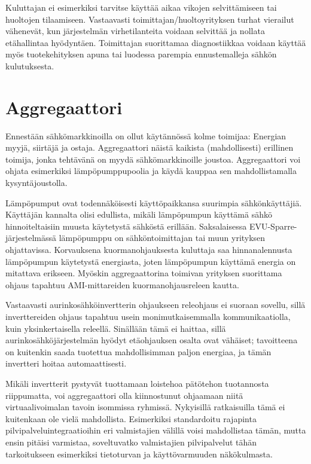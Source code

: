   Kuluttajan ei esimerkiksi tarvitse käyttää aikaa vikojen selvittämiseen tai huoltojen tilaamiseen. Vastaavasti toimittajan/huoltoyrityksen turhat vierailut vähenevät, kun järjestelmän virhetilanteita voidaan selvittää ja nollata etähallintaa hyödyntäen. Toimittajan suorittamaa diagnostiikkaa voidaan käyttää myös tuotekehityksen apuna tai luodessa parempia ennustemalleja sähkön kulutuksesta.

\section{Aggregaattori}

  Ennestään sähkömarkkinoilla on ollut käytännössä kolme toimijaa: Energian myyjä, siirtäjä ja ostaja. Aggregaattori näistä kaikista (mahdollisesti) erillinen toimija, jonka tehtävänä on myydä sähkömarkkinoille joustoa. Aggregaattori voi ohjata esimerkiksi lämpöpumppupoolia ja käydä kauppaa sen mahdollistamalla kysyntäjoustolla.

  Lämpöpumput ovat todennäköisesti käyttöpaikkansa suurimpia sähkönkäyttäjiä. Käyttäjän kannalta olisi edullista, mikäli lämpöpumpun käyttämä sähkö hinnoiteltaisiin muusta käytetystä sähköstä erillään. Saksalaisessa EVU-Sparre-järjestelmässä lämpöpumppu on sähköntoimittajan tai muun yrityksen ohjattavissa. Korvauksena kuormanohjauksesta kuluttaja saa hinnanalennusta lämpöpumpun käytetystä energiasta, joten lämpöpumpun käyttämä energia on mitattava erikseen. Myöskin aggregaattorina toimivan yrityksen suorittama ohjaus tapahtuu AMI-mittareiden kuormanohjausreleen kautta. \parencite{enwg, VDEARN4100}

  Vastaavasti aurinkosähköinvertterin ohjaukseen releohjaus ei suoraan sovellu, sillä inverttereiden ohjaus tapahtuu usein monimutkaisemmalla kommunikaatiolla, kuin yksinkertaisella releellä. Sinällään tämä ei haittaa, sillä aurinkosähköjärjestelmän hyödyt etäohjauksen osalta ovat vähäiset; tavoitteena on kuitenkin saada tuotettua mahdollisimman paljon energiaa, ja tämän invertteri hoitaa automaattisesti.

  Mikäli invertterit pystyvät tuottamaan loistehoa pätötehon tuotannosta riippumatta, voi aggregaattori olla kiinnostunut ohjaamaan niitä virtuaalivoimalan tavoin isommissa ryhmissä. Nykyisillä ratkaisuilla tämä ei kuitenkaan ole vielä mahdollista. Esimerkiksi standardoitu rajapinta pilvipalveluintegraatioihin eri valmistajien välillä voisi mahdollistaa tämän, mutta ensin pitäisi varmistaa, soveltuvatko valmistajien pilvipalvelut tähän tarkoitukseen esimerkiksi tietoturvan ja käyttövarmuuden näkökulmasta.

